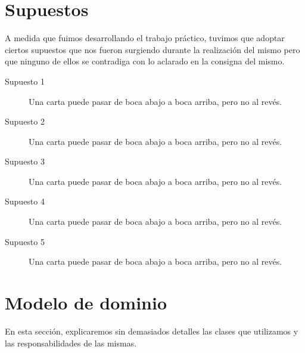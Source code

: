 \section{Supuestos}

A medida que fuimos desarrollando el trabajo práctico, tuvimos que adoptar ciertos supuestos que nos fueron surgiendo durante la realización del mismo pero que ninguno de ellos se contradiga con lo aclarado en la consigna del mismo.

\begin{description}

\item[Supuesto 1] Una carta puede pasar de boca abajo a boca arriba, pero no al revés.

\item[Supuesto 2] Una carta puede pasar de boca abajo a boca arriba, pero no al revés.

\item[Supuesto 3] Una carta puede pasar de boca abajo a boca arriba, pero no al revés.

\item[Supuesto 4] Una carta puede pasar de boca abajo a boca arriba, pero no al revés.

\item[Supuesto 5] Una carta puede pasar de boca abajo a boca arriba, pero no al revés.

\end{description}

\section{Modelo de dominio}

	
En esta sección, explicaremos sin demasiados detalles las clases que utilizamos y las responsabilidades de las mismas.


